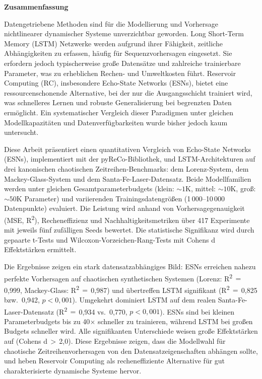 \thispagestyle{empty}
\vspace*{0.2cm}

\begin{center}
    \textbf{Zusammenfassung}
\end{center}

\vspace*{0.5cm}

\noindent
Datengetriebene Methoden sind für die Modellierung und Vorhersage nichtlinearer dynamischer Systeme unverzichtbar geworden. Long Short-Term Memory (LSTM) Netzwerke werden aufgrund ihrer Fähigkeit, zeitliche Abhängigkeiten zu erfassen, häufig für Sequenzvorhersagen eingesetzt. Sie erfordern jedoch typischerweise große Datensätze und zahlreiche trainierbare Parameter, was zu erheblichen Rechen- und Umweltkosten führt. Reservoir Computing (RC), insbesondere Echo-State Networks (ESNs), bietet eine ressourcenschonende Alternative, bei der nur die Ausgangsschicht trainiert wird, was schnelleres Lernen und robuste Generalisierung bei begrenzten Daten ermöglicht. Ein systematischer Vergleich dieser Paradigmen unter gleichen Modellkapazitäten und Datenverfügbarkeiten wurde bisher jedoch kaum untersucht.

\noindent
Diese Arbeit präsentiert einen quantitativen Vergleich von Echo-State Networks (ESNs), implementiert mit der pyReCo-Bibliothek, und LSTM-Architekturen auf drei kanonischen chaotischen Zeitreihen-Benchmarks: dem Lorenz-System, dem Mackey-Glass-System und dem Santa-Fe-Laser-Datensatz. Beide Modellfamilien werden unter gleichen Gesamtparameterbudgets (klein: ${\sim}1$K, mittel: ${\sim}10$K, groß: ${\sim}50$K Parameter) und variierenden Trainingsdatengrößen (1\,000--10\,000 Datenpunkte) evaluiert. Die Leistung wird anhand von Vorhersagegenauigkeit (MSE, R\textsuperscript{2}), Recheneffizienz und Nachhaltigkeitsmetriken über 417 Experimente mit jeweils fünf zufälligen Seeds bewertet. Die statistische Signifikanz wird durch gepaarte t-Tests und Wilcoxon-Vorzeichen-Rang-Tests mit Cohens d Effektstärken ermittelt.

\noindent
Die Ergebnisse zeigen ein stark datensatzabhängiges Bild: ESNs erreichen nahezu perfekte Vorhersagen auf chaotischen synthetischen Systemen (Lorenz: R\textsuperscript{2}\,$=$\,0,999, Mackey-Glass: R\textsuperscript{2}\,$=$\,0,987) und übertreffen LSTM signifikant (R\textsuperscript{2}\,$=$\,0,825 bzw.\ 0,942, $p < 0{,}001$). Umgekehrt dominiert LSTM auf dem realen Santa-Fe-Laser-Datensatz (R\textsuperscript{2}\,$=$\,0,934 vs.\ 0,770, $p < 0{,}001$). ESNs sind bei kleinen Parameterbudgets bis zu 40$\times$ schneller zu trainieren, während LSTM bei großen Budgets schneller wird. Alle signifikanten Unterschiede weisen große Effektstärken auf (Cohens d\,$>$\,2,0). Diese Ergebnisse zeigen, dass die Modellwahl für chaotische Zeitreihenvorhersagen von den Datensatzeigenschaften abhängen sollte, und heben Reservoir Computing als recheneffiziente Alternative für gut charakterisierte dynamische Systeme hervor.